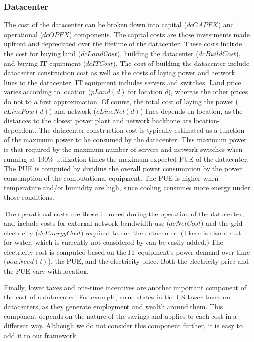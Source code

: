 \subsubsection{Datacenter} The cost of the datacenter can be broken down into capital ($dcCAPEX$) and operational ($dcOPEX$) components.  The capital costs are those investments made upfront and depreciated over the lifetime of the datacenter.  These costs include the cost for buying land ($dcLandCost$), building the datacenter ($dcBuildCost$), and buying IT equipment ($dcITCost$).  The cost of building the datacenter include datacenter construction cost as well as the costs of laying power and network lines to the datacenter.  IT equipment includes servers and switches.  Land price varies according to location ($pLand(d)$ for location $d$), whereas the other prices do not to a first approximation.  Of course, the total cost of laying the power ($cLinePow(d)$) and network ($cLineNet(d)$) lines depends on location, as the distances to the closest power plant and network backbone are location-dependent.  The datacenter construction cost is typically estimated as a function of the maximum power to be consumed by the datacenter.  This maximum power is that required by the maximum number of servers and network switches when running at 100\% utilization times the maximum expected PUE of the datacenter.  The PUE is computed by dividing the overall power consumption by the power consumption of the computational equipment.  The PUE is higher when temperature and/or humidity are high, since cooling consumes more energy under those conditions.

The operational costs are those incurred during the operation of the datacenter, and include costs for external network bandwidth use ($dcNetCost$) and the grid electricity ($dcEnergyCost$) required to run the datacenter.  (There is also a cost for water, which is currently not considered by can be easily added.)  The electricity cost is computed based on the IT equipment's power demand over time ($powNeed(t)$), the PUE, and the electricity price.  Both the electricity price and the PUE vary with location.

Finally, lower taxes and one-time incentives are another important component of the cost of a datacenter.  For example, some states in the US lower taxes on datacenters, as they generate employment and wealth around them.  This component depends on the nature of the savings and applies to each cost in a different way.  Although we do not consider this component further, it is easy to add it to our framework.

